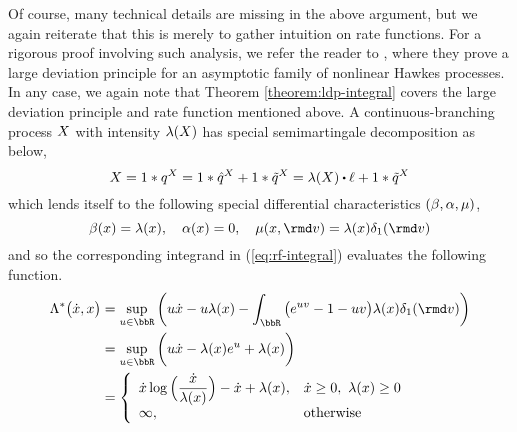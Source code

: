 \begin{example}
  Of course, many technical details are missing in the above argument, but we again reiterate that this is merely to gather intuition on rate functions.
  For a rigorous proof involving such analysis, we refer the reader to \cite{gao2018b}, where they prove a large deviation principle for an asymptotic family of nonlinear Hawkes processes.
  In any case, we again note that Theorem \ref{theorem:ldp-integral} covers the large deviation principle and rate function mentioned above.
  A continuous-branching process $X$ with intensity $\lambda(X)$ has special semimartingale decomposition as below,
  \begin{equation*}
    \X = 1 \ast \jumpMeas^{\X} = 1 \ast \predproj{\jumpMeas^{\X}} + 1 \ast \compensate{\jumpMeas^{\X}} = \affInt(\X) \shortInt \leb + 1 \ast \compensate{\jumpMeas^{\X}}
  \end{equation*}
  which lends itself to the following special differential characteristics $(\beta, \alpha, \mu)$,
  \begin{equation*}
    \affDrift(\stateVar) = \affInt(\stateVar), \quad
    \affDiff(\stateVar) = 0, \quad
    \affJump(\stateVar, \rmd\markVar) = \affInt(\stateVar) \delta_1(\rmd\markVar)
  \end{equation*}
  and so the corresponding integrand in (\ref{eq:rf-integral}) evaluates the following function.
  \begin{align*}
    \ode^*\big(\diffVar, \stateVar \big) 
    &= \sup_{\momentVar\in\bbR}\bigg( \momentVar \diffVar - \momentVar\affInt(\stateVar) - \int_\bbR \big( e^{\momentVar\markVar} - 1 - \momentVar\markVar \big) \affInt(\stateVar)\delta_1(\rmd\markVar) \bigg) \\
    &= \sup_{\momentVar\in\bbR}\bigg( \momentVar \diffVar - \affInt(\stateVar) e^\momentVar + \affInt(\stateVar) \bigg) \\
    &= \left\{\begin{array}{ll}
      \displaystyle \diffVar \log\Big(\frac{\diffVar}{\affInt(\stateVar)}\Big) - \diffVar + \affInt(\stateVar), & \diffVar \geq 0, ~ \affInt(\stateVar) \geq 0 \\
      \infty, & \text{otherwise}
    \end{array}\right.
  \end{align*}


\end{example}
